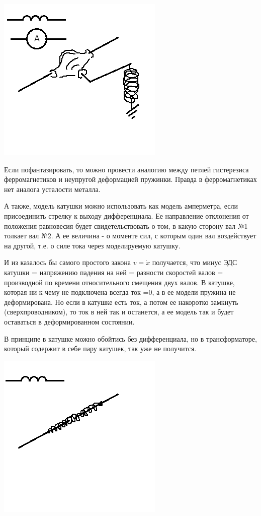 \documentclass[11pt]{article} %
\begin{document}
\includegraphics{../L_post.png}

Если пофантазировать, то можно провести аналогию между петлей гистерезиса ферромагнетиков и неупругой деформацией пружинки. Правда в ферромагнетиках нет аналога усталости металла.

А также, модель катушки можно использовать как модель амперметра, если присоединить стрелку к выходу дифференциала.
Ее направление отклонения от положения равновесия будет свидетельствовать о том, в какую сторону вал №1 толкает вал №2. А ее величина - о моменте сил, с которым один вал воздействует на другой, т.е. о силе тока через моделируемую катушку.

И из казалось бы самого простого закона $v=\dot x$ получается, что минус ЭДС катушки = напряжению падения на ней = разности скоростей валов = производной по времени относительного смещения двух валов.
В катушке, которая ни к чему не подключена всегда ток =0, а в ее модели пружина не деформирована.
Но если в катушке есть ток, а потом ее накоротко замкнуть (сверхпроводником), то ток в ней так и останется, 
а ее модель так и будет оставаться в деформированном состоянии.

В принципе в катушке можно обойтись без дифференциала, но в трансформаторе, который содержит в себе пару катушек, так уже не получится.

\includegraphics{../L_ndiff.png}
\end{document}
